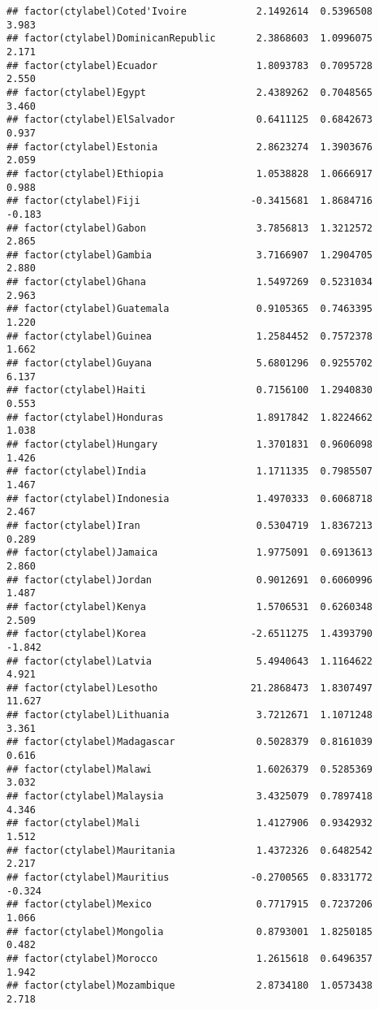 \documentclass[12pt]{article}\usepackage[]{graphicx}\usepackage[]{color}
\makeatletter
\newenvironment{kframe}{%
 \def\at@end@of@kframe{}%
 \ifinner\ifhmode%
  \def\at@end@of@kframe{\end{minipage}}%
  \begin{minipage}{\columnwidth}%
 \fi\fi%
 \def\FrameCommand##1{\hskip\@totalleftmargin \hskip-\fboxsep
 \colorbox{shadecolor}{##1}\hskip-\fboxsep
     \hskip-\linewidth \hskip-\@totalleftmargin \hskip\columnwidth}%
 \MakeFramed {\advance\hsize-\width
   \@totalleftmargin\z@ \linewidth\hsize
   \@setminipage}}%
 {\par\unskip\endMakeFramed%
 \at@end@of@kframe}
\newenvironment{knitrout}{}{} %
\makeatother
\begin{document}
\begin{knitrout}
\begin{kframe}
\begin{verbatim}
## factor(ctylabel)Coted'Ivoire            2.1492614  0.5396508   3.983
## factor(ctylabel)DominicanRepublic       2.3868603  1.0996075   2.171
## factor(ctylabel)Ecuador                 1.8093783  0.7095728   2.550
## factor(ctylabel)Egypt                   2.4389262  0.7048565   3.460
## factor(ctylabel)ElSalvador              0.6411125  0.6842673   0.937
## factor(ctylabel)Estonia                 2.8623274  1.3903676   2.059
## factor(ctylabel)Ethiopia                1.0538828  1.0666917   0.988
## factor(ctylabel)Fiji                   -0.3415681  1.8684716  -0.183
## factor(ctylabel)Gabon                   3.7856813  1.3212572   2.865
## factor(ctylabel)Gambia                  3.7166907  1.2904705   2.880
## factor(ctylabel)Ghana                   1.5497269  0.5231034   2.963
## factor(ctylabel)Guatemala               0.9105365  0.7463395   1.220
## factor(ctylabel)Guinea                  1.2584452  0.7572378   1.662
## factor(ctylabel)Guyana                  5.6801296  0.9255702   6.137
## factor(ctylabel)Haiti                   0.7156100  1.2940830   0.553
## factor(ctylabel)Honduras                1.8917842  1.8224662   1.038
## factor(ctylabel)Hungary                 1.3701831  0.9606098   1.426
## factor(ctylabel)India                   1.1711335  0.7985507   1.467
## factor(ctylabel)Indonesia               1.4970333  0.6068718   2.467
## factor(ctylabel)Iran                    0.5304719  1.8367213   0.289
## factor(ctylabel)Jamaica                 1.9775091  0.6913613   2.860
## factor(ctylabel)Jordan                  0.9012691  0.6060996   1.487
## factor(ctylabel)Kenya                   1.5706531  0.6260348   2.509
## factor(ctylabel)Korea                  -2.6511275  1.4393790  -1.842
## factor(ctylabel)Latvia                  5.4940643  1.1164622   4.921
## factor(ctylabel)Lesotho                21.2868473  1.8307497  11.627
## factor(ctylabel)Lithuania               3.7212671  1.1071248   3.361
## factor(ctylabel)Madagascar              0.5028379  0.8161039   0.616
## factor(ctylabel)Malawi                  1.6026379  0.5285369   3.032
## factor(ctylabel)Malaysia                3.4325079  0.7897418   4.346
## factor(ctylabel)Mali                    1.4127906  0.9342932   1.512
## factor(ctylabel)Mauritania              1.4372326  0.6482542   2.217
## factor(ctylabel)Mauritius              -0.2700565  0.8331772  -0.324
## factor(ctylabel)Mexico                  0.7717915  0.7237206   1.066
## factor(ctylabel)Mongolia                0.8793001  1.8250185   0.482
## factor(ctylabel)Morocco                 1.2615618  0.6496357   1.942
## factor(ctylabel)Mozambique              2.8734180  1.0573438   2.718

\end{verbatim}
\end{kframe}
\end{knitrout}
\end{document}
